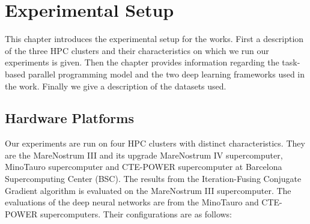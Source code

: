 \chapter{Experimental Setup}
\label{chap:methodology}
This chapter introduces the experimental setup for the works.  First a 
description of the three HPC clusters and their characteristics on which we run 
our experiments is given.
Then the chapter provides information regarding the task-based parallel 
programming model and the two deep learning frameworks used in the work.
Finally we give a description of the datasets used.

\section{Hardware Platforms} Our experiments are run on four HPC clusters with 
distinct characteristics.  They are the MareNostrum III and its upgrade 
MareNostrum IV supercomputer, MinoTauro supercomputer and CTE-POWER 
supercomputer at Barcelona Supercomputing Center (BSC). The results from the 
Iteration-Fusing Conjugate Gradient algorithm is evaluated on the MareNostrum 
III supercomputer. The evaluations of the deep neural networks are from the 
MinoTauro and CTE-POWER supercomputers. Their configurations are as follows:
